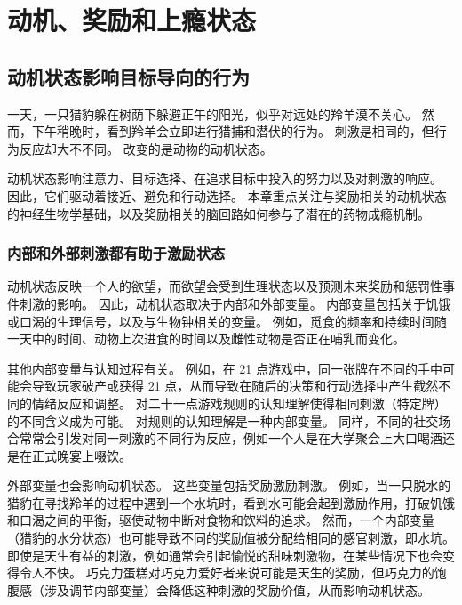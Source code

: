 \chapter{动机、奖励和上瘾状态} \label{chap:chap43}

\section{动机状态影响目标导向的行为}

一天，一只猎豹躲在树荫下躲避正午的阳光，似乎对远处的羚羊漠不关心。
然而，下午稍晚时，看到羚羊会立即进行猎捕和潜伏的行为。
刺激是相同的，但行为反应却大不不同。
改变的是动物的动机状态。



动机状态影响注意力、目标选择、在追求目标中投入的努力以及对刺激的响应。
因此，它们驱动着接近、避免和行动选择。
本章重点关注与奖励相关的动机状态的神经生物学基础，以及奖励相关的脑回路如何参与了潜在的药物成瘾机制。



\subsection{内部和外部刺激都有助于激励状态}

动机状态反映一个人的欲望，而欲望会受到生理状态以及预测未来奖励和惩罚性事件刺激的影响。
因此，动机状态取决于内部和外部变量。
内部变量包括关于饥饿或口渴的生理信号，以及与生物钟相关的变量。
例如，觅食的频率和持续时间随一天中的时间、动物上次进食的时间以及雌性动物是否正在哺乳而变化。


其他内部变量与认知过程有关。
例如，在 21 点游戏中，同一张牌在不同的手中可能会导致玩家破产或获得 21 点，从而导致在随后的决策和行动选择中产生截然不同的情绪反应和调整。
对二十一点游戏规则的认知理解使得相同刺激（特定牌）的不同含义成为可能。
对规则的认知理解是一种内部变量。
同样，不同的社交场合常常会引发对同一刺激的不同行为反应，例如一个人是在大学聚会上大口喝酒还是在正式晚宴上啜饮。


外部变量也会影响动机状态。
这些变量包括奖励激励刺激。
例如，当一只脱水的猎豹在寻找羚羊的过程中遇到一个水坑时，看到水可能会起到激励作用，打破饥饿和口渴之间的平衡，驱使动物中断对食物和饮料的追求。
然而，一个内部变量（猎豹的水分状态）也可能导致不同的奖励值被分配给相同的感官刺激，即水坑。
即使是天生有益的刺激，例如通常会引起愉悦的甜味刺激物，在某些情况下也会变得令人不快。
巧克力蛋糕对巧克力爱好者来说可能是天生的奖励，但巧克力的饱腹感（涉及调节内部变量）会降低这种刺激的奖励价值，从而影响动机状态。



